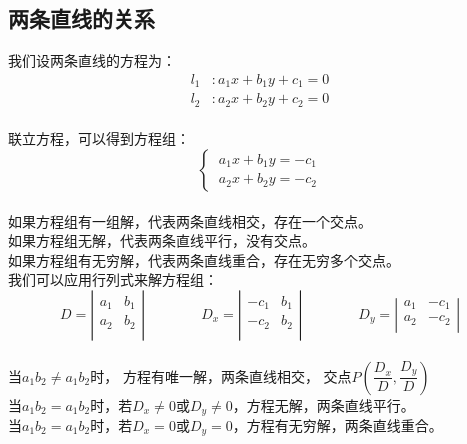 \documentclass[UTF8]{ctexart}
\begin{document}
\subsection{两条直线的关系}
    我们设两条直线的方程为：
    \begin{align*}
        l_{1}&:a_{1}x+b_{1}y+c_{1}=0\\
        l_{2}&:a_{2}x+b_{2}y+c_{2}=0
    \end{align*}\\
    联立方程，可以得到方程组：\\
    \begin{equation*}
        \begin{cases}
            \ a_{1}x+b_{1}y=-c_{1}\\
            \ a_{2}x+b_{2}y=-c_{2}
        \end{cases}
    \end{equation*}\\[4mm]
    如果方程组有一组解，代表两条直线相交，存在一个交点。\\[3mm]
    如果方程组无解，代表两条直线平行，没有交点。\\[3mm]
    如果方程组有无穷解，代表两条直线重合，存在无穷多个交点。\\[3mm]

    我们可以应用行列式来解方程组：\\
    \begin{equation*}
        D=
        \left|
        \begin{matrix}
            a_{1} & b_{1}\\
            a_{2} & b_{2}\\
        \end{matrix}
        \right|
        \qquad\qquad
        D_{x}=
        \left|
        \begin{matrix}
            -c_{1} & b_{1}\\
            -c_{2} & b_{2}\\
        \end{matrix}
        \right|
        \qquad\qquad
        D_{y}=
        \left|
        \begin{matrix}
            a_{1} & -c_{1}\\
            a_{2} & -c_{2}\\
        \end{matrix}
        \right|
    \end{equation*}\\[3mm]
    当$a_{1}b_{2} \neq a_{1}b_{2}$时，
    方程有唯一解，两条直线相交，
    交点$P(\dfrac{D_{x}}{D},\dfrac{D_{y}}{D})$\\[4mm]
    当$a_{1}b_{2} = a_{1}b_{2}$时，若$D_{x}\neq 0$或$D_{y}\neq 0$，方程无解，两条直线平行。\\[4mm]
    当$a_{1}b_{2} = a_{1}b_{2}$时，若$D_{x}=0$或$D_{y}=0$，方程有无穷解，两条直线重合。
\end{document}
